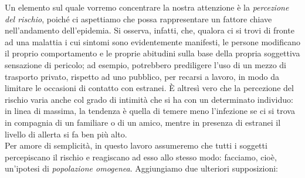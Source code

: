 Un elemento sul quale vorremo concentrare la nostra attenzione è la \emph{percezione del rischio}, poiché ci aspettiamo che possa rappresentare un fattore chiave nell'andamento dell'epidemia. Si osserva, infatti, che, qualora ci si trovi di fronte ad una malattia i cui sintomi sono evidentemente manifesti, le persone modificano il proprio comportamento e le proprie abitudini sulla base della propria soggettiva sensazione di pericolo; ad esempio, potrebbero prediligere l'uso di un mezzo di trasporto privato, rispetto ad uno pubblico, per recarsi a lavoro, in modo da limitare le occasioni di contatto con estranei. È altresì vero che la percezione del rischio varia anche col grado di intimità che si ha con un determinato individuo: in linea di massima, la tendenza è quella di temere meno l'infezione se ci si trova in compagnia di un familiare o di un amico, mentre in presenza di estranei il livello di allerta si fa ben più alto. \\Per amore di semplicità, in questo lavoro assumeremo che tutti i soggetti percepiscano il rischio e reagiscano ad esso allo stesso modo: facciamo, cioè, un'ipotesi di \emph{popolazione omogenea}. Aggiungiamo due ulteriori supposizioni:
